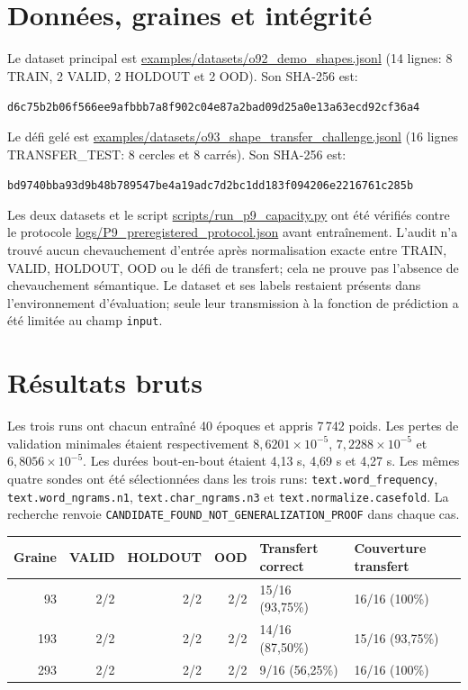 \documentclass[11pt,a4paper,oneside]{report}
\begin{document}
\section{Données, graines et intégrité}
Le dataset principal est \url{examples/datasets/o92_demo_shapes.jsonl} (14 lignes: 8 TRAIN, 2 VALID, 2 HOLDOUT et 2 OOD). Son SHA-256 est:
\begin{center}\small
\texttt{d6c75b2b}\allowbreak\texttt{06f566ee}\allowbreak\texttt{9afbbb7a}\allowbreak\texttt{8f902c04}\allowbreak\texttt{e87a2bad}\allowbreak\texttt{09d25a0e}\allowbreak\texttt{13a63ecd}\allowbreak\texttt{92cf36a4}
\end{center}
Le défi gelé est \url{examples/datasets/o93_shape_transfer_challenge.jsonl} (16 lignes TRANSFER\_TEST: 8 cercles et 8 carrés). Son SHA-256 est:
\begin{center}\small
\texttt{bd9740bb}\allowbreak\texttt{a93d9b48}\allowbreak\texttt{b789547b}\allowbreak\texttt{e4a19adc}\allowbreak\texttt{7d2bc1dd}\allowbreak\texttt{183f0942}\allowbreak\texttt{06e22167}\allowbreak\texttt{61c285b}
\end{center}
Les deux datasets et le script \url{scripts/run_p9_capacity.py} ont été vérifiés contre le protocole \url{logs/P9_preregistered_protocol.json} avant entraînement. L'audit n'a trouvé aucun chevauchement d'entrée après normalisation exacte entre TRAIN, VALID, HOLDOUT, OOD ou le défi de transfert; cela ne prouve pas l'absence de chevauchement sémantique. Le dataset et ses labels restaient présents dans l'environnement d'évaluation; seule leur transmission à la fonction de prédiction a été limitée au champ \texttt{input}.

\section{Résultats bruts}
Les trois runs ont chacun entraîné 40 époques et appris 7\,742 poids. Les pertes de validation minimales étaient respectivement $8,6201\times10^{-5}$, $7,2288\times10^{-5}$ et $6,8056\times10^{-5}$. Les durées bout-en-bout étaient 4,13 s, 4,69 s et 4,27 s. Les mêmes quatre sondes ont été sélectionnées dans les trois runs: \texttt{text.word\_frequency}, \texttt{text.word\_ngrams.n1}, \texttt{text.char\_ngrams.n3} et \texttt{text.normalize.casefold}. La recherche renvoie \texttt{CANDIDATE\_FOUND\_NOT\_GENERALIZATION\_PROOF} dans chaque cas.

\begin{center}
\small
\begin{tabularx}{\linewidth}{r r r r X X}
\toprule
Graine & VALID & HOLDOUT & OOD & Transfert correct & Couverture transfert \\
\midrule
93 & 2/2 & 2/2 & 2/2 & 15/16 (93,75\%) & 16/16 (100\%) \\
193 & 2/2 & 2/2 & 2/2 & 14/16 (87,50\%) & 15/16 (93,75\%) \\
293 & 2/2 & 2/2 & 2/2 & 9/16 (56,25\%) & 16/16 (100\%) \\
\bottomrule
\end{tabularx}
\end{center}
\end{document}
